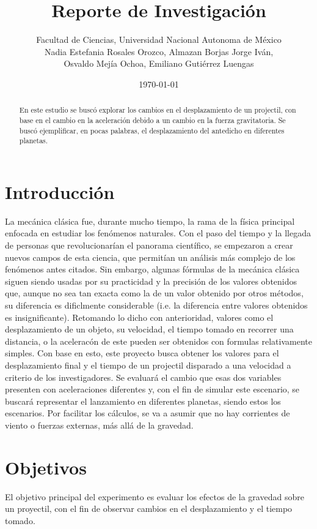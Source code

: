 \documentclass{article}
\title{Reporte de Investigación}
\author{Facultad de Ciencias, Universidad Nacional Autonoma de México\\
Nadia Estefania Rosales Orozco, Almazan Borjas Jorge Iv\'an,\\ Osvaldo Mej\'ia Ochoa, Emiliano Guti\'errez Luengas}
\date{\today}
\begin{document}
\maketitle

\begin{abstract}
  En este estudio se buscó explorar los cambios en el desplazamiento de un projectil, con base en el cambio en la aceleración debido a un cambio en la fuerza gravitatoria. Se buscó ejemplificar, en pocas palabras, el desplazamiento del antedicho en diferentes planetas.
\end{abstract}


\section{Introducci\'on}
La mec\'anica cl\'asica fue, durante mucho tiempo, la rama de la f\'isica principal enfocada en estudiar los fen\'omenos naturales. Con el paso del tiempo y la llegada de personas que revolucionar\'ian el panorama cient\'ifico, se empezaron a crear nuevos campos de esta ciencia, que permit\'ian un an\'alisis m\'as complejo de los fen\'omenos antes citados. Sin embargo, algunas f\'ormulas de la mec\'anica cl\'asica siguen siendo usadas por su practicidad y la precisi\'on de los valores obtenidos que, aunque no sea tan exacta como la de un valor obtenido por otros m\'etodos, su diferencia es dificlmente considerable (i.e. la diferencia entre valores obtenidos es insignificante).
Retomando lo dicho con anterioridad, valores como el desplazamiento de un objeto, su velocidad, el tiempo tomado en recorrer una distancia, o la acelerac\'on de este pueden ser obtenidos con formulas relativamente simples. Con base en esto, este proyecto busca obtener los valores para el desplazamiento final y el tiempo de un projectil disparado a una velocidad a criterio de los investigadores. Se evaluará el cambio que esas dos variables presenten con aceleraciones diferentes y, con el fin de simular este escenario, se buscar\'a representar el lanzamiento en diferentes planetas, siendo estos los escenarios.
Por facilitar los c\'alculos, se va a asumir que no hay corrientes de viento o fuerzas externas, m\'as all\'a de la gravedad.


\section{Objetivos}
El objetivo principal del experimento es evaluar los efectos de la gravedad sobre un proyectil, con el fin de observar cambios en el desplazamiento y el tiempo tomado.
\end{document}
